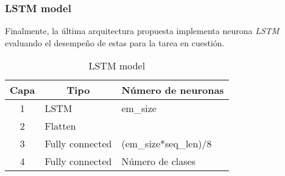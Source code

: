 \subsubsection{LSTM model}
Finalmente, la última arquitectura propuesta implementa neurona \textit{LSTM} evaluando el desempeño de estas para la tarea en cuestión.

\begin{table}[H]
\centering
\caption{LSTM model}
\label{tab:LSTM_1}
\begin{tabular}{|c|l|l|}
\hline
\textbf{Capa} & \multicolumn{1}{c|}{\textbf{Tipo}} & \multicolumn{1}{c|}{\textbf{Número de neuronas}} \\ \hline
1             & LSTM                               & em\_size                                               \\ \hline
2             & Flatten                            &                                                  \\ \hline
3             & Fully connected                    & (em\_size*seq\_len)/8                           \\ \hline
4             & Fully connected                    & Número de clases                                 \\ \hline
\end{tabular}
\end{table}